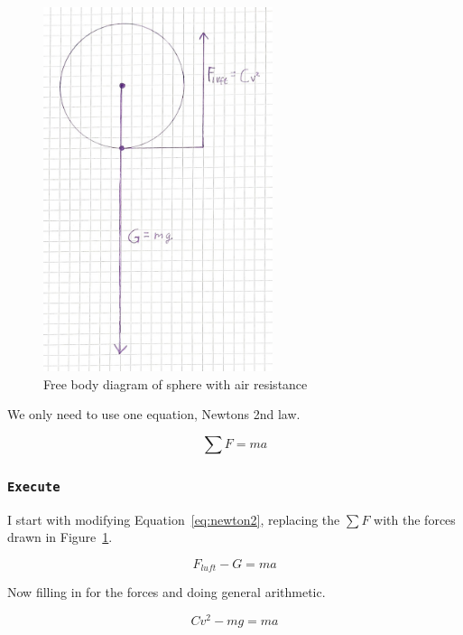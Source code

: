 \documentclass{article}
\let\oldsubsubsection\subsubsection
\renewcommand{\subsubsection}[1]{%
  \oldsubsubsection{\texttt{#1}}%
}
\begin{document}
\begin{figure}[h]
    \centering
    \includegraphics[width=0.6\textwidth]{Figures/Forces.jpg}
    \caption{Free body diagram of sphere with air resistance}
    \label{fig:Free_body_diagram}
\end{figure}
\clearpage
We only need to use one equation, Newtons 2nd law.

\begin{equation}
    \sum F = ma
    \label{eq:newton2}
\end{equation}

\subsubsection{Execute}

I start with modifying Equation~\ref{eq:newton2}, replacing the \(\sum F\) with the forces drawn in Figure~\ref{fig:Free_body_diagram}.

\begin{equation}
    F_{luft} - G = ma
    \label{eq:newton2_sphere}
\end{equation}

Now filling in for the forces and doing general arithmetic.

\begin{equation*}
    Cv^2 - mg = ma
\end{equation*}
\end{document}
